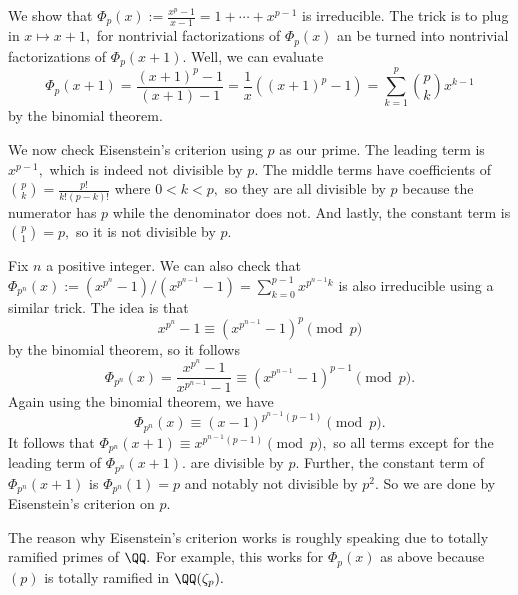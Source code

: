 \documentclass[../notes.tex]{subfiles}
\begin{document}
\begin{example}
	We show that $\Phi_p(x):=\frac{x^p-1}{x-1}=1+\cdots+x^{p-1}$ is irreducible. The trick is to plug in $x\mapsto x+1,$ for nontrivial factorizations of $\Phi_p(x)$ an be turned into nontrivial factorizations of $\Phi_p(x+1).$ Well, we can evaluate
	\[\Phi_p(x+1)=\frac{(x+1)^p-1}{(x+1)-1}=\frac1x\left((x+1)^p-1\right)=\sum_{k=1}^p\binom pkx^{k-1}\]
	by the binomial theorem.
	
	We now check Eisenstein's criterion using $p$ as our prime. The leading term is $x^{p-1},$ which is indeed not divisible by $p.$ The middle terms have coefficients of $\binom pk=\frac{p!}{k!(p-k)!}$ where $0<k<p,$ so they are all divisible by $p$ because the numerator has $p$ while the denominator does not. And lastly, the constant term is $\binom p1=p,$ so it is not divisible by $p.$
\end{example}
\begin{example}
	Fix $n$ a positive integer. We can also check that $\Phi_{p^n}(x):=\left(x^{p^n}-1\right)/\left(x^{p^{n-1}}-1\right)=\sum_{k=0}^{p-1}x^{p^{n-1}k}$ is also irreducible using a similar trick. The idea is that
	\[x^{p^n}-1\equiv\left(x^{p^{n-1}}-1\right)^p\pmod p\]
	by the binomial theorem, so it follows
	\[\Phi_{p^n}(x)=\frac{x^{p^n}-1}{x^{p^{n-1}}-1}\equiv\left(x^{p^{n-1}}-1\right)^{p-1}\pmod p.\]
	Again using the binomial theorem, we have
	\[\Phi_{p^n}(x)\equiv(x-1)^{p^{n-1}(p-1)}\pmod p.\]
	It follows that $\Phi_{p^n}(x+1)\equiv x^{p^{n-1}(p-1)}\pmod p,$ so all terms except for the leading term of $\Phi_{p^n}(x+1).$ are divisible by $p.$ Further, the constant term of $\Phi_{p^n}(x+1)$ is $\Phi_{p^n}(1)=p$ and notably not divisible by $p^2.$ So we are done by Eisenstein's criterion on $p.$
\end{example}
\begin{remark}
	The reason why Eisenstein's criterion works is roughly speaking due to totally ramified primes of $\QQ.$ For example, this works for $\Phi_p(x)$ as above because $(p)$ is totally ramified in $\QQ(\zeta_p).$
\end{remark}
\end{document}
